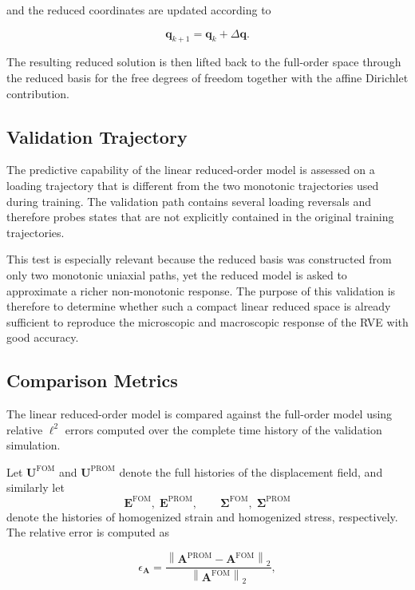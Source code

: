 \documentclass[11pt,a4paper]{article}
\begin{document}
and the reduced coordinates are updated according to

\begin{equation}
\mathbf{q}_{k+1} = \mathbf{q}_k + \Delta \mathbf{q}.
\end{equation}

The resulting reduced solution is then lifted back to the full-order space through the reduced basis for the free degrees of freedom together with the affine Dirichlet contribution.

\subsection{Validation Trajectory}

The predictive capability of the linear reduced-order model is assessed on a loading trajectory that is different from the two monotonic trajectories used during training. The validation path contains several loading reversals and therefore probes states that are not explicitly contained in the original training trajectories.

This test is especially relevant because the reduced basis was constructed from only two monotonic uniaxial paths, yet the reduced model is asked to approximate a richer non-monotonic response. The purpose of this validation is therefore to determine whether such a compact linear reduced space is already sufficient to reproduce the microscopic and macroscopic response of the RVE with good accuracy.

\subsection{Comparison Metrics}

The linear reduced-order model is compared against the full-order model using relative $\ell^2$ errors computed over the complete time history of the validation simulation.

Let $\mathbf{U}^{\mathrm{FOM}}$ and $\mathbf{U}^{\mathrm{PROM}}$ denote the full histories of the displacement field, and similarly let
\[
\mathbf{E}^{\mathrm{FOM}},\;\mathbf{E}^{\mathrm{PROM}},
\qquad
\mathbf{\Sigma}^{\mathrm{FOM}},\;\mathbf{\Sigma}^{\mathrm{PROM}}
\]
denote the histories of homogenized strain and homogenized stress, respectively. The relative error is computed as

\begin{equation}
\epsilon_{\mathbf{A}}
=
\frac{
\left\|
\mathbf{A}^{\mathrm{PROM}} - \mathbf{A}^{\mathrm{FOM}}
\right\|_2
}{
\left\|
\mathbf{A}^{\mathrm{FOM}}
\right\|_2
},
\end{equation}
\end{document}
